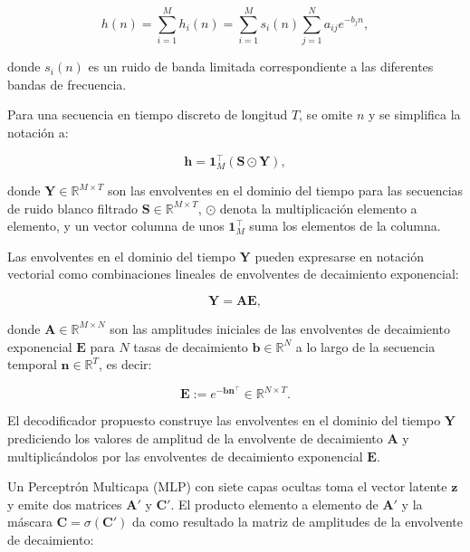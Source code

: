 \begin{equation}
h(n) = \sum_{i=1}^{M} h_i(n) = \sum_{i=1}^{M} s_i(n) \sum_{j=1}^{N} a_{ij} e^{-b_j n},
\end{equation}

donde $s_i(n)$ es un ruido de banda limitada correspondiente a las diferentes bandas de frecuencia.

Para una secuencia en tiempo discreto de longitud $T$, se omite $n$ y se simplifica la notación a:

\begin{equation}
\mathbf{h} = \mathbf{1}_M^\intercal (\mathbf{S} \odot \mathbf{Y}),
\end{equation}

donde $\mathbf{Y} \in \mathbb{R}^{M \times T}$ son las envolventes en el dominio del tiempo para las secuencias de ruido blanco filtrado $\mathbf{S} \in \mathbb{R}^{M \times T}$, $\odot$ denota la multiplicación elemento a elemento, y un vector columna de unos $\mathbf{1}_M^\intercal$ suma los elementos de la columna. 

Las envolventes en el dominio del tiempo $\mathbf{Y}$ pueden expresarse en notación vectorial como combinaciones lineales de envolventes de decaimiento exponencial:

\begin{equation}
\mathbf{Y} = \mathbf{A}\mathbf{E},
\end{equation}

donde $\mathbf{A} \in \mathbb{R}^{M \times N}$ son las amplitudes iniciales de las envolventes de decaimiento exponencial $\mathbf{E}$ para $N$ tasas de decaimiento $\mathbf{b} \in \mathbb{R}^{N}$ a lo largo de la secuencia temporal $\mathbf{n} \in \mathbb{R}^{T}$, es decir:

\begin{equation}
\label{eq:envolvente_E}
\mathbf{E} := e^{-\mathbf{b}\mathbf{n}^\intercal} \in \mathbb{R}^{N \times T}.
\end{equation}

El decodificador propuesto construye las envolventes en el dominio del tiempo $\mathbf{Y}$ prediciendo los valores de amplitud de la envolvente de decaimiento $\mathbf{A}$ y multiplicándolos por las envolventes de decaimiento exponencial $\mathbf{E}$.

Un Perceptrón Multicapa (MLP) con siete capas ocultas toma el vector latente $\mathbf{z}$ y emite dos matrices $\mathbf{A}'$ y $\mathbf{C}'$. El producto elemento a elemento de $\mathbf{A}'$ y la máscara $\mathbf{C} = \sigma(\mathbf{C}')$ da como resultado la matriz de amplitudes de la envolvente de decaimiento:


